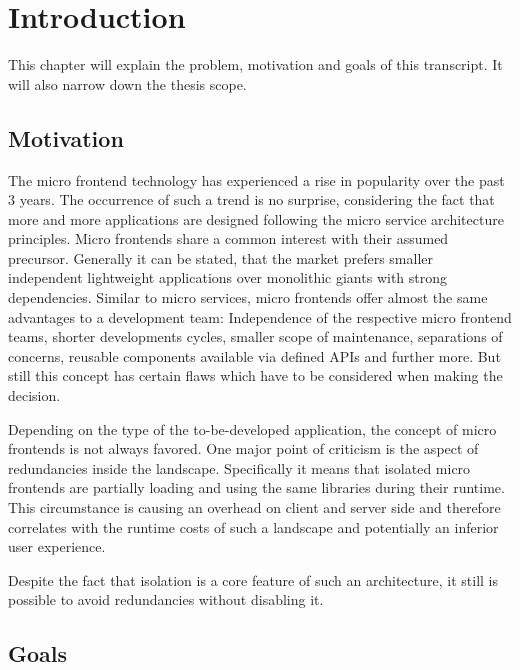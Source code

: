 \chapter{Introduction} %
\label{Chapter1}


This chapter will explain the problem, motivation and goals of this transcript. 
It will also narrow down the thesis scope.

\section{Motivation}

The micro frontend technology has experienced a rise in popularity over the past 3 years. The occurrence of such a trend is no surprise, considering the fact that more and more applications are designed following the micro service architecture principles.\cite{google_micro_frontend_trends} 
Micro frontends share a common interest with their assumed precursor. Generally it can be stated, that the market prefers smaller independent lightweight applications over monolithic giants with strong dependencies. Similar to micro services, micro frontends offer almost the same advantages to a development team: Independence of the respective micro frontend teams, shorter developments cycles, smaller scope of maintenance, separations of concerns, reusable components available via defined APIs and further more.\cite{advantages_of_mfes} But still this concept has certain flaws which have to be considered when making the decision.\cite{Yang_2019}

Depending on the type of the to-be-developed application, the concept of micro frontends is not always favored. One major point of criticism is the aspect of redundancies inside the landscape. Specifically it means that isolated micro frontends are partially loading and using the same libraries during their runtime. This circumstance is causing an overhead on client and server side and therefore correlates with the runtime costs of such a landscape and potentially an inferior user experience.\cite{motivation_benefits_adopting_MFs}

Despite the fact that isolation is a core feature of such an architecture, it still is possible to avoid redundancies without disabling it.

\section{Goals}

